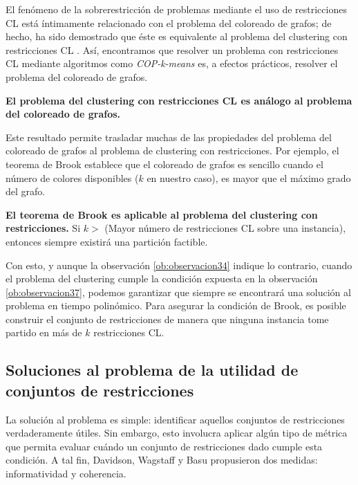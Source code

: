 El fenómeno de la sobrerestricción de problemas mediante el uso de restricciones \acf{CL} está íntimamente relacionado con el problema del coloreado de grafos; de hecho, ha sido demostrado que éste es equivalente al problema del clustering con restricciones \acs{CL} \cite{DavidsonRavi:2006}. Así, encontramos que resolver un problema con restricciones \acs{CL} mediante algoritmos como \textit{COP-k-means} es, a efectos prácticos, resolver el problema del coloreado de grafos.

\begin{observacion}
	
	\textbf{El problema del clustering con restricciones \acs{CL} es análogo al problema del coloreado de grafos.} \cite{Survey:2007}
	
\end{observacion}

Este resultado permite trasladar muchas de las propiedades del problema del coloreado de grafos al problema de clustering con restricciones. Por ejemplo, el teorema de Brook establece que el coloreado de grafos es sencillo cuando el número de colores disponibles ($k$ en nuestro caso), es mayor que el máximo grado del grafo. 

\begin{observacion}
	
	\textbf{El teorema de Brook es aplicable al problema del clustering con restricciones.}
	Si $ k > $ (Mayor número de restricciones \acs{CL} sobre una instancia), entonces siempre existirá una partición factible. \cite{Survey:2007} \label{ob:observacion37}
	
\end{observacion}

Con esto, y aunque la observación \ref{ob:observacion34} indique lo contrario, cuando el problema del clustering cumple la condición expuesta en la observación \ref{ob:observacion37}, podemos garantizar que siempre se encontrará una solución al problema en tiempo polinómico. Para asegurar la condición de Brook, es posible construir el conjunto de restricciones de manera que ninguna instancia tome partido en más de $k$ restricciones \acf{CL}. \cite{DavidsonRavi:2006}

\subsection{Soluciones al problema de la utilidad de conjuntos de restricciones}

La solución al problema es simple: identificar aquellos conjuntos de restricciones verdaderamente útiles. Sin embargo, esto involucra aplicar algún tipo de métrica que permita evaluar cuándo un conjunto de restricciones dado cumple esta condición. A tal fin, Davidson, Wagstaff y Basu propusieron dos medidas: informatividad y coherencia.\\

